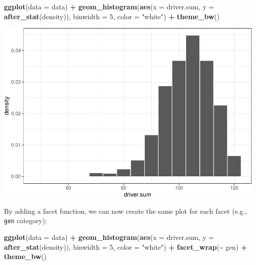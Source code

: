 \documentclass[
]{book}
\newenvironment{Shaded}{\begin{snugshade}}{\end{snugshade}}
\newcommand{\AttributeTok}[1]{\textcolor[rgb]{0.13,0.29,0.53}{#1}}
\newcommand{\DecValTok}[1]{\textcolor[rgb]{0.00,0.00,0.81}{#1}}
\newcommand{\FunctionTok}[1]{\textcolor[rgb]{0.13,0.29,0.53}{\textbf{#1}}}
\newcommand{\NormalTok}[1]{#1}
\newcommand{\SpecialCharTok}[1]{\textcolor[rgb]{0.81,0.36,0.00}{\textbf{#1}}}
\newcommand{\StringTok}[1]{\textcolor[rgb]{0.31,0.60,0.02}{#1}}
\begin{document}
\begin{Shaded}
\begin{Highlighting}[]
\FunctionTok{ggplot}\NormalTok{(}\AttributeTok{data =}\NormalTok{ data) }\SpecialCharTok{+}
  \FunctionTok{geom\_histogram}\NormalTok{(}\FunctionTok{aes}\NormalTok{(}\AttributeTok{x =}\NormalTok{ driver.sum, }\AttributeTok{y =} \FunctionTok{after\_stat}\NormalTok{(density)), }\AttributeTok{binwidth =} \DecValTok{5}\NormalTok{, }\AttributeTok{color =} \StringTok{"white"}\NormalTok{) }\SpecialCharTok{+}
  \FunctionTok{theme\_bw}\NormalTok{()}
\end{Highlighting}
\end{Shaded}

\includegraphics{R-for-social-research-and-business-analytics_files/figure-latex/unnamed-chunk-42-1.pdf}

By adding a facet function, we can now create the same plot for each facet (e.g., \texttt{gen} category):

\begin{Shaded}
\begin{Highlighting}[]
\FunctionTok{ggplot}\NormalTok{(}\AttributeTok{data =}\NormalTok{ data) }\SpecialCharTok{+}
  \FunctionTok{geom\_histogram}\NormalTok{(}\FunctionTok{aes}\NormalTok{(}\AttributeTok{x =}\NormalTok{ driver.sum, }\AttributeTok{y =} \FunctionTok{after\_stat}\NormalTok{(density)), }\AttributeTok{binwidth =} \DecValTok{5}\NormalTok{, }\AttributeTok{color =} \StringTok{"white"}\NormalTok{) }\SpecialCharTok{+}
  \FunctionTok{facet\_wrap}\NormalTok{(}\SpecialCharTok{\textasciitilde{}}\NormalTok{ gen) }\SpecialCharTok{+}
  \FunctionTok{theme\_bw}\NormalTok{()}
\end{Highlighting}
\end{Shaded}
\end{document}
